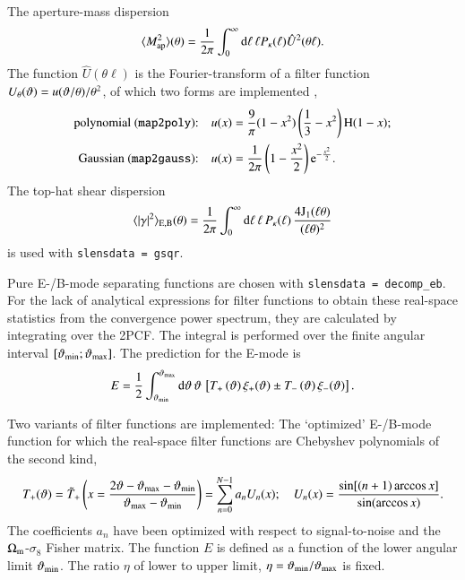 \documentclass[11pt, chapterprefix, headsepline]{scrartcl}
\begin{document}
The aperture-mass
dispersion \citep{1998MNRAS.296..873S}
%
\begin{equation}
  \langle M_{\rm ap}^2 \rangle (\theta) = 
  \frac 1 {2\pi} \int_0^\infty {\mathrm d} \ell \, \ell
  P_\kappa(\ell) \hat U^2(\theta \ell) .
\end{equation}
%
The function $\hat U(\theta \ell)$ is the Fourier-transform of a filter function 
$U_\theta(\vartheta) = u(\vartheta/\theta)/\theta^2$,
of which two forms are implemented
\citep{1998MNRAS.296..873S, 2002ApJ...568...20C},
%
\begin{align}
  \mbox{polynomial (\texttt{map2poly}):} \quad & u(x) = \frac 9 \pi (1-x^2)\left(\frac 1 3
    - x^2 \right) {\mathrm H}(1-x); \\
  \mbox{Gaussian (\texttt{map2gauss}):} \quad & u(x) = \frac 1 {2\pi} \left( 1 - \frac{x^2}{2} \right)
  {\rm e}^{- \frac{x^2}{2}} .
  \label{map-Gauss}
\end{align}
%
The top-hat shear dispersion \citep{1992ApJ...388..272K}
%
\begin{equation}
\langle |\gamma|^2\rangle _{\rm E, B}(\theta) = \frac 1 {2\pi}
\int_0^\infty {\mathrm d} \ell \, \ell \, P_\kappa(\ell) \, \frac{4 {\mathrm J}_1(\ell
  \theta)}{(\ell \theta)^2}
\end{equation}
%
is used with \texttt{slensdata = gsqr}.


Pure E-/B-mode separating functions \citep{SK07} are chosen 
with \texttt{slensdata = decomp\_eb}. For the lack of analytical
expressions for filter functions to obtain these real-space statistics
from the convergence power spectrum, they are calculated by
integrating over the 2PCF. The integral is performed over the finite
angular interval $[\vartheta_{\rm min}; \vartheta_{\rm max}]$.
The prediction for the E-mode is
%
\begin{equation}
  E = \frac 1 2 \int_{\vartheta_{\rm min}}^{\vartheta_{\rm max}} {\mathrm d} \vartheta \, \vartheta \,
  \left[ T_+\left( {\vartheta} \right) \xi_+(\vartheta) \pm
       T_-\left( {\vartheta} \right) \xi_-(\vartheta) \right] .
     \label{X_EB}
\end{equation}

Two variants of filter functions are implemented: The `optimized'
E-/B-mode function \cite{FK10} for which the real-space filter
functions are Chebyshev polynomials of the second kind,
%
\begin{align}
  T_{+}(\vartheta) = 
\tilde T_+\left(x = \frac{2\vartheta - \vartheta_{\rm max} - \vartheta_{\rm min}}{\vartheta_{\rm max} - \vartheta_{\rm min}} \right) 
  = \sum_{n=0}^{N-1} a_n U_n(x); \quad U_n(x) = \frac{\sin[(n+1) \arccos x]}{\sin(\arccos x)}.
\end{align}
%
The coefficients $a_n$ have been optimized with respect to
signal-to-noise and the $\Omega_{\rm m}$-$\sigma_8$ Fisher matrix.
The function $E$ is defined as a function of the lower angular limit
$\vartheta_{\rm min}$. The ratio $\eta$ of lower to upper limit, $\eta =
\vartheta_{\rm min} / \vartheta_{\rm max}$ is fixed.
\end{document}
